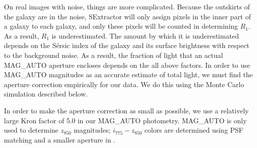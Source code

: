 On real images with noise, things are more complicated. Because the
outskirts of the galaxy are in the noise, {\sc SExtractor} will only
assign pixels in the inner part of a galaxy to each galaxy, and only
these pixels will be counted in determining $R_1$. As a result, $R_1$
is underestimated. The amount by which it is underestimated depends on
the S{\'e}rsic index of the galaxy and its surface brightness with
respect to the background noise. As a result, the fraction of light
that an actual MAG\_AUTO aperture encloses depends on the all above
factors. In order to use MAG\_AUTO magnitudes as an accurate estimate
of total light, we must find the aperture correction empirically for
our data. We do this using the Monte Carlo simulation described below.

In order to make the aperture correction as small as possible, we use
a relatively large Kron factor of 5.0 in our MAG\_AUTO
photometry. MAG\_AUTO is only used to determine $z_{850}$ magnitudes;
$i_{775}-z_{850}$ colors are determined using PSF matching and a
smaller aperture in \citet{meyers11a}.

